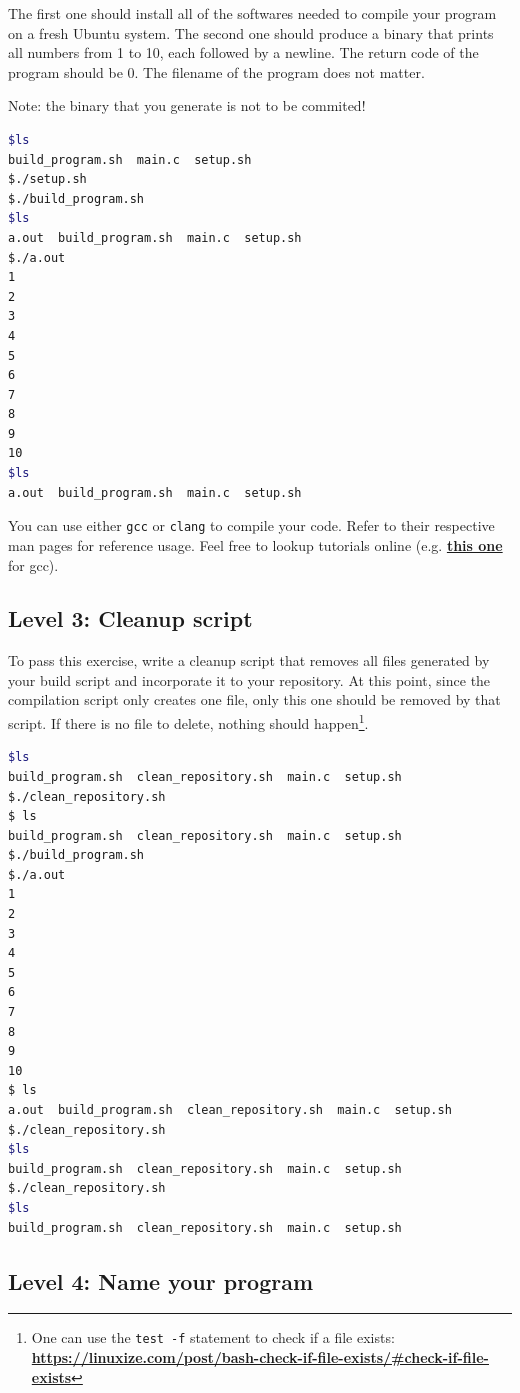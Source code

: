 \documentclass[12pt]{article}
\let\oldhref\href
\renewcommand{\href}[2]{\oldhref{#1}{\bfseries#2}}
\begin{document}
The first one should install all of the softwares needed to compile your program on a fresh Ubuntu system.
The second one should produce a binary that prints all numbers from 1 to 10, each followed by a newline. The return code of the program should be 0. The filename of the program does not matter.

Note: the binary that you generate is not to be commited!

\begin{lstlisting}[language=bash]
$ls
build_program.sh  main.c  setup.sh
$./setup.sh
$./build_program.sh
$ls
a.out  build_program.sh  main.c  setup.sh
$./a.out
1
2
3
4
5
6
7
8
9
10
$ls
a.out  build_program.sh  main.c  setup.sh
\end{lstlisting}

You can use either \texttt{gcc} or \texttt{clang} to compile your code. Refer to their respective man pages for reference usage. Feel free to lookup tutorials online (e.g. \href{https://www3.ntu.edu.sg/home/ehchua/programming/cpp/gcc\_make.html}{this one} for gcc).

\subsection{Level 3: Cleanup script}

To pass this exercise, write a cleanup script that removes all files generated by your build script and incorporate it to your repository. At this point, since the compilation script only creates one file, only this one should be removed by that script.
If there is no file to delete, nothing should happen\footnote{One can use the \texttt{test -f} statement to check if a file exists: \href{click here}{https://linuxize.com/post/bash-check-if-file-exists/\#check-if-file-exists}}.

\begin{lstlisting}[language=bash]
$ls
build_program.sh  clean_repository.sh  main.c  setup.sh
$./clean_repository.sh
$ ls
build_program.sh  clean_repository.sh  main.c  setup.sh
$./build_program.sh
$./a.out
1
2
3
4
5
6
7
8
9
10
$ ls
a.out  build_program.sh  clean_repository.sh  main.c  setup.sh
$./clean_repository.sh
$ls
build_program.sh  clean_repository.sh  main.c  setup.sh
$./clean_repository.sh
$ls
build_program.sh  clean_repository.sh  main.c  setup.sh
\end{lstlisting}

\subsection{Level 4: Name your program}
\end{document}
